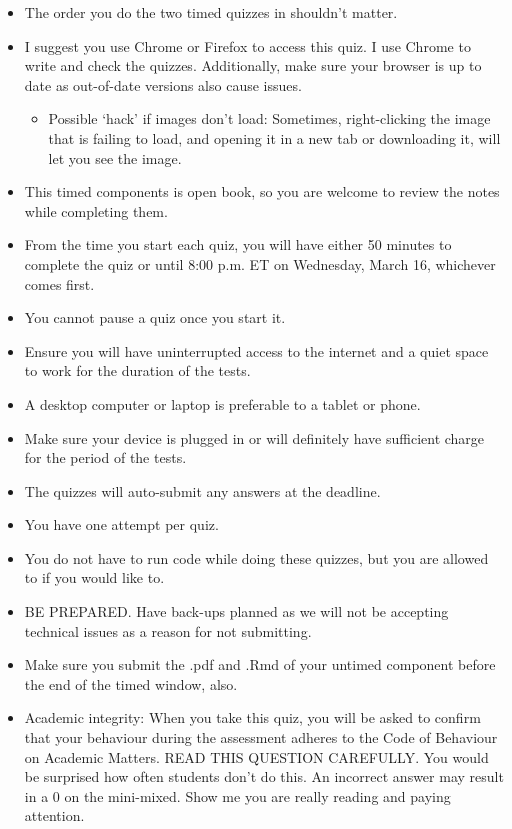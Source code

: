 \documentclass[
  openany]{book}
\providecommand{\tightlist}{%
  \setlength{\itemsep}{0pt}\setlength{\parskip}{0pt}}
\begin{document}
\begin{itemize}
\item
  The order you do the two timed quizzes in shouldn't matter.
\item
  I suggest you use Chrome or Firefox to access this quiz. I use Chrome to write and check the quizzes. Additionally, make sure your browser is up to date as out-of-date versions also cause issues.

  \begin{itemize}
  \tightlist
  \item
    Possible `hack' if images don't load: Sometimes, right-clicking the image that is failing to load, and opening it in a new tab or downloading it, will let you see the image.
  \end{itemize}
\item
  This timed components is open book, so you are welcome to review the notes while completing them.
\item
  From the time you start each quiz, you will have either 50 minutes to complete the quiz or until 8:00 p.m. ET on Wednesday, March 16, whichever comes first.
\item
  You cannot pause a quiz once you start it.
\item
  Ensure you will have uninterrupted access to the internet and a quiet space to work for the duration of the tests.
\item
  A desktop computer or laptop is preferable to a tablet or phone.
\item
  Make sure your device is plugged in or will definitely have sufficient charge for the period of the tests.
\item
  The quizzes will auto-submit any answers at the deadline.
\item
  You have one attempt per quiz.
\item
  You do not have to run code while doing these quizzes, but you are allowed to if you would like to.
\item
  BE PREPARED. Have back-ups planned as we will not be accepting technical issues as a reason for not submitting.
\item
  Make sure you submit the .pdf and .Rmd of your untimed component before the end of the timed window, also.
\item
  Academic integrity: When you take this quiz, you will be asked to confirm that your behaviour during the assessment adheres to the Code of Behaviour on Academic Matters. READ THIS QUESTION CAREFULLY. You would be surprised how often students don't do this. An incorrect answer may result in a 0 on the mini-mixed. Show me you are really reading and paying attention.
\end{itemize}
\end{document}

